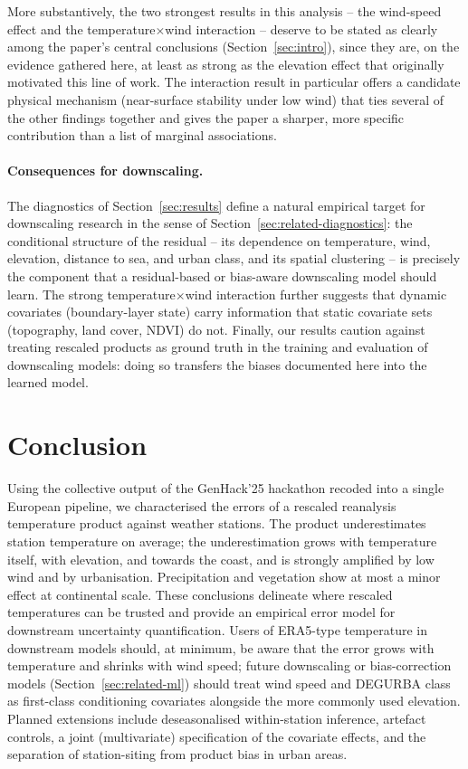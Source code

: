 \documentclass[a4paper,12pt,leqno]{article}
\begin{document}
More substantively, the two strongest results in this analysis -- the
wind-speed effect and the temperature$\times$wind interaction -- deserve
to be stated as clearly among the paper's central conclusions
(Section~\ref{sec:intro}), since they are, on the evidence gathered here,
at least as strong as the elevation effect that originally motivated
this line of work. The interaction result in particular offers a
candidate physical mechanism (near-surface stability under low wind)
that ties several of the other findings together and gives the paper a
sharper, more specific contribution than a list of marginal associations.

\paragraph{Consequences for downscaling.}
The diagnostics of Section~\ref{sec:results} define a natural empirical
target for downscaling research in the sense of
Section~\ref{sec:related-diagnostics}: the conditional structure of the
residual -- its dependence on temperature, wind, elevation, distance to
sea, and urban class, and its spatial clustering -- is precisely the
component that a residual-based or bias-aware downscaling model should
learn. The strong temperature$\times$wind interaction further suggests
that dynamic covariates (boundary-layer state) carry information that
static covariate sets (topography, land cover, NDVI) do not. Finally,
our results caution against treating rescaled products as ground truth
in the training and evaluation of downscaling models: doing so transfers
the biases documented here into the learned model.

\section{Conclusion}
\label{sec:conclusion}

Using the collective output of the GenHack'25 hackathon recoded into a
single European pipeline, we characterised the errors of a rescaled
reanalysis temperature product against weather stations. The product
underestimates station temperature on average; the underestimation grows
with temperature itself, with elevation, and towards the coast, and is
strongly amplified by low wind and by urbanisation. Precipitation and
vegetation show at most a minor effect at continental scale. These
conclusions delineate where rescaled temperatures can be trusted and
provide an empirical error model for downstream uncertainty
quantification. Users of ERA5-type temperature in downstream models
should, at minimum, be aware that the error grows with temperature and
shrinks with wind speed; future downscaling or bias-correction models
(Section~\ref{sec:related-ml}) should treat wind speed and DEGURBA class
as first-class conditioning covariates alongside the more commonly used
elevation. Planned extensions include deseasonalised within-station
inference, artefact controls, a joint (multivariate) specification of
the covariate effects, and the separation of station-siting from product
bias in urban areas.

\printbibliography
\end{document}
